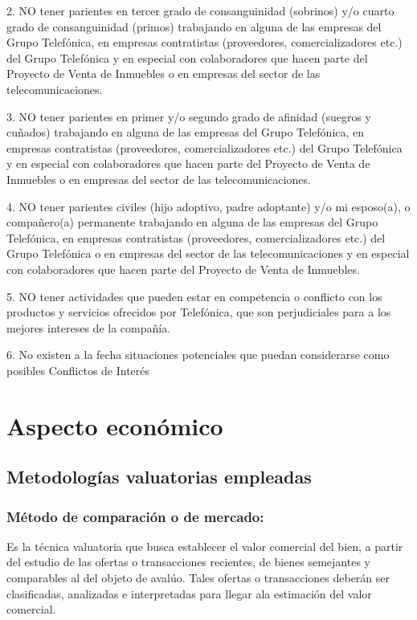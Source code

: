 \documentclass[12pt,a4paper,twoside]{article}
\begin{document}
2. NO tener parientes en tercer grado de consanguinidad (sobrinos) y/o cuarto grado de consanguinidad (primos) trabajando en alguna de las empresas del Grupo Telefónica, en empresas contratistas (proveedores, comercializadores etc.) del Grupo Telefónica y en especial con colaboradores que hacen parte del Proyecto de Venta de Inmuebles o en empresas del sector de las telecomunicaciones.

3. NO tener parientes en primer y/o segundo grado de afinidad (suegros y cuñados) trabajando en alguna de las empresas del Grupo Telefónica, en empresas contratistas (proveedores, comercializadores etc.) del Grupo Telefónica y en especial con colaboradores que hacen parte del Proyecto de Venta de Inmuebles o en empresas del sector de las telecomunicaciones.

4. NO tener parientes civiles (hijo adoptivo, padre adoptante) y/o mi esposo(a), o compañero(a) permanente trabajando en alguna de las empresas del Grupo Telefónica, en empresas contratistas (proveedores, comercializadores etc.) del Grupo Telefónica o en empresas del sector de las telecomunicaciones y en especial con colaboradores que hacen parte del Proyecto de Venta de Inmuebles.

5. NO tener actividades que pueden estar en competencia o conflicto con los productos y servicios ofrecidos por Telefónica, que son perjudiciales para a los mejores intereses de la compañía.

6. No existen a la fecha situaciones potenciales que puedan considerarse como posibles Conflictos de Interés
	

\section{Aspecto económico}

\subsection{Metodologías valuatorias empleadas}

\subsubsection{Método  de  comparación  o  de  mercado:}  	

Es  la  técnica  valuatoria  que busca  establecer  el  valor  comercial  del  bien,  a  partir  del  estudio  de  las  ofertas  o transacciones recientes, de bienes semejantes y comparables al del objeto de avalúo. Tales ofertas o transacciones deberán ser clasificadas, analizadas e interpretadas para llegar ala estimación del valor comercial.
\end{document}
